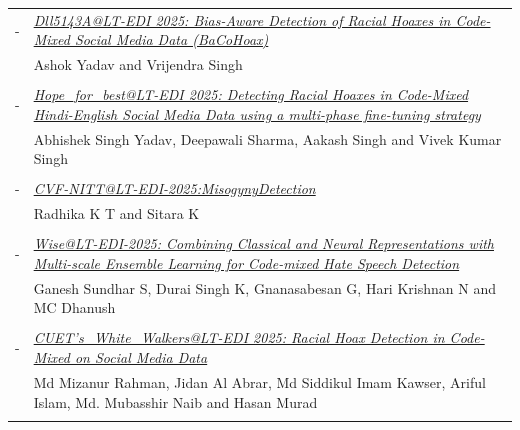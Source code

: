 \documentclass[11pt,oneside]{book}
\begin{document}
\begin{tabular}{p{24mm}p{124mm}}
                       -  & \hyperlink{page.31}{\emph{Dll5143A@LT-EDI 2025: Bias-Aware Detection of Racial Hoaxes in Code-Mixed Social Media Data (BaCoHoax)}}\\
        & Ashok Yadav\index{Yadav} and Vrijendra Singh\index{Singh}\\\\
                
                       -  & \hyperlink{page.39}{\emph{Hope\_for\_best@LT-EDI 2025: Detecting Racial Hoaxes in Code-Mixed Hindi-English Social Media Data using a multi-phase fine-tuning strategy}}\\
        & Abhishek Singh Yadav\index{Yadav}, Deepawali Sharma\index{Sharma}, Aakash Singh\index{Singh} and Vivek Kumar Singh\index{Singh}\\\\
                
                       -  & \hyperlink{page.47}{\emph{CVF-NITT@LT-EDI-2025:MisogynyDetection}}\\
        & Radhika K T\index{T} and Sitara K\index{K}\\\\
                
                       -  & \hyperlink{page.54}{\emph{Wise@LT-EDI-2025: Combining Classical and Neural Representations with Multi-scale Ensemble Learning for Code-mixed Hate Speech Detection}}\\
        & Ganesh Sundhar S\index{S}, Durai Singh K\index{K}, Gnanasabesan G\index{G}, Hari Krishnan N\index{N} and MC Dhanush\index{Dhanush}\\\\
                
                       -  & \hyperlink{page.63}{\emph{CUET's\_White\_Walkers@LT-EDI 2025: Racial Hoax Detection in Code-Mixed on Social Media Data}}\\
        & Md Mizanur Rahman\index{Rahman}, Jidan Al Abrar\index{Abrar}, Md Siddikul Imam Kawser\index{Kawser}, Ariful Islam\index{Islam}, Md. Mubasshir Naib\index{Naib} and Hasan Murad\index{Murad}\\\\
              \end{tabular}
    \newpage
\end{document}
